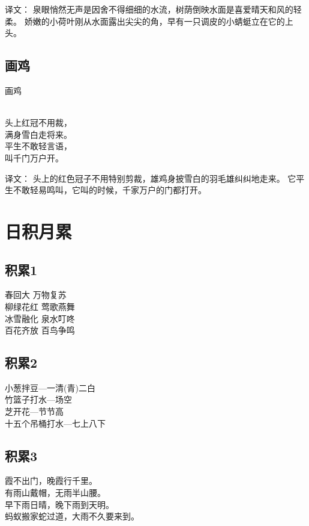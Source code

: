 译文：
泉眼悄然无声是因舍不得细细的水流，树荫倒映水面是喜爱晴天和风的轻柔。
娇嫩的小荷叶刚从水面露出尖尖的角，早有一只调皮的小蜻蜓立在它的上头。


\subsection{画鸡}
\begin{pinyinscope}
	\noindent \huge 画鸡
	
	  \\
	
	\noindent 头上红冠不用裁，\\满身雪白走将来。\\
	平生不敢轻言语，\\ 叫千门万户开。
\end{pinyinscope}

译文：
头上的红色冠子不用特别剪裁，雄鸡身披雪白的羽毛雄纠纠地走来。
它平生不敢轻易鸣叫，它叫的时候，千家万户的门都打开。

\section{日积月累}
\subsection{积累1}
\begin{pinyinscope}
	\huge
	\noindent 春回大 \quad 万物复苏\\
	柳绿花红 \quad 莺歌燕舞\\
	冰雪融化 \quad 泉水叮咚\\
	百花齐放 \quad 百鸟争鸣
\end{pinyinscope}

\subsection{积累2}
\begin{pinyinscope}
	\huge
	\noindent 小葱拌豆---一清(青)二白\\
	竹篮子打水---场空\\
	芝开花---节节高\\
	十五个吊桶打水---七上八下
\end{pinyinscope}

\subsection{积累3}
\begin{pinyinscope}
	\huge
	\noindent {}霞不出门，晚霞行千里。\\
	有雨山戴帽，无雨半山腰。\\
	早下雨日晴，晚下雨到天明。\\
	蚂蚁搬家蛇过道，大雨不久要来到。
\end{pinyinscope}

